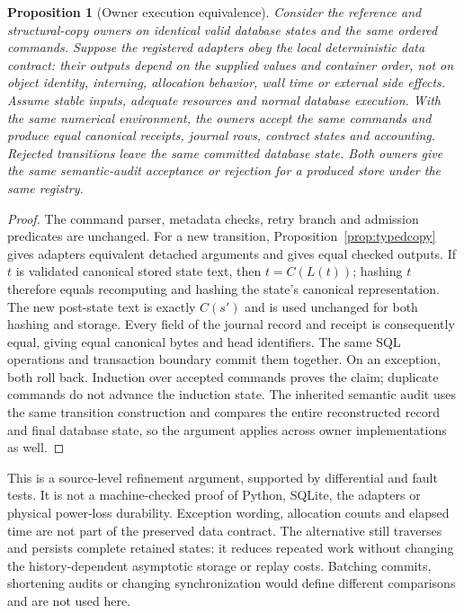 \documentclass[11pt,a4paper]{article}
\newtheorem{proposition}[theorem]{Proposition}
\theoremstyle{definition}\newtheorem{definition}[theorem]{Definition}
\begin{document}
\begin{proposition}[Owner execution equivalence]\label{prop:ownerequivalence}
Consider the reference and structural-copy owners on identical valid database states and the same ordered commands. Suppose the registered adapters obey the local deterministic data contract: their outputs depend on the supplied values and container order, not on object identity, interning, allocation behavior, wall time or external side effects. Assume stable inputs, adequate resources and normal database execution. With the same numerical environment, the owners accept the same commands and produce equal canonical receipts, journal rows, contract states and accounting. Rejected transitions leave the same committed database state. Both owners give the same semantic-audit acceptance or rejection for a produced store under the same registry.
\end{proposition}
\begin{proof}
The command parser, metadata checks, retry branch and admission predicates are unchanged. For a new transition, Proposition~\ref{prop:typedcopy} gives adapters equivalent detached arguments and gives equal checked outputs. If $t$ is validated canonical stored state text, then $t=C(L(t))$; hashing $t$ therefore equals recomputing and hashing the state's canonical representation. The new post-state text is exactly $C(s')$ and is used unchanged for both hashing and storage. Every field of the journal record and receipt is consequently equal, giving equal canonical bytes and head identifiers. The same SQL operations and transaction boundary commit them together. On an exception, both roll back. Induction over accepted commands proves the claim; duplicate commands do not advance the induction state. The inherited semantic audit uses the same transition construction and compares the entire reconstructed record and final database state, so the argument applies across owner implementations as well.
\end{proof}

This is a source-level refinement argument, supported by differential and fault tests. It is not a machine-checked proof of Python, SQLite, the adapters or physical power-loss durability. Exception wording, allocation counts and elapsed time are not part of the preserved data contract. The alternative still traverses and persists complete retained states: it reduces repeated work without changing the history-dependent asymptotic storage or replay costs. Batching commits, shortening audits or changing synchronization would define different comparisons and are not used here.
\end{document}
